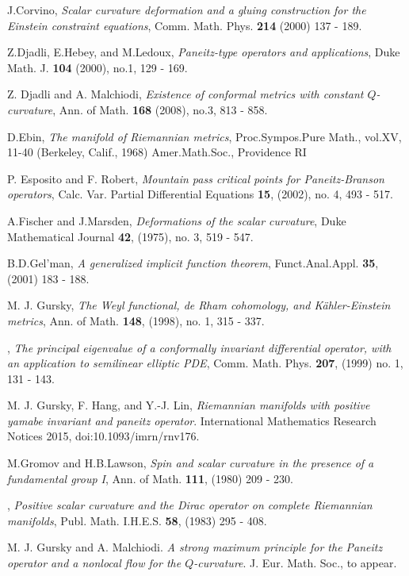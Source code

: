 \documentclass[12pt]{amsart}
\theoremstyle{definition}
\theoremstyle{remark}
\numberwithin{equation}{section}
\begin{document}
\begin{thebibliography}{10}
 J.Corvino, \textit{Scalar curvature deformation and a gluing construction for the Einstein constraint equations}, Comm. Math. Phys. \textbf{214} (2000) 137 - 189.

 Z.Djadli, E.Hebey, and M.Ledoux, \textit{Paneitz-type operators and applications}, Duke Math. J. \textbf{104} (2000), no.1, 129 - 169.
  

 Z. Djadli and A. Malchiodi, \textit{Existence of conformal metrics with constant {$Q$}-curvature}, Ann. of Math. \textbf{168} (2008), no.3, 813 - 858. 

 D.Ebin, \textit{The manifold of Riemannian metrics}, Proc.Sympos.Pure Math., vol.XV, 11-40 (Berkeley, Calif., 1968) Amer.Math.Soc., Providence RI

P. Esposito and F. Robert, \textit{Mountain pass critical points for Paneitz-Branson operators}, Calc. Var. Partial Differential Equations \textbf{15}, (2002), no. 4, 493 - 517. 

 A.Fischer and J.Marsden, \textit{Deformations of the scalar curvature},  Duke Mathematical Journal \textbf{42}, (1975), no. 3, 519 - 547.

 B.D.Gel'man, \textit{A generalized implicit function theorem}, Funct.Anal.Appl. \textbf{35}, (2001) 183 - 188.

M. J. Gursky, \textit{The {W}eyl functional, de {R}ham cohomology, and {K}\"ahler-{E}instein metrics}, Ann. of Math. \textbf{148}, (1998), no. 1, 315 - 337. 

\bysame, \emph{The principal eigenvalue of a conformally invariant differential operator, with an application to semilinear elliptic {PDE}}, Comm. Math. Phys. \textbf{207}, (1999) no. 1, 131 - 143. 

 M. J. Gursky, F. Hang, and Y.-J. Lin, \textit{Riemannian manifolds with positive yamabe invariant and paneitz operator}. International Mathematics Research Notices 2015, doi:10.1093/imrn/rnv176.

 M.Gromov and H.B.Lawson, \textit{Spin and scalar curvature in the presence of a fundamental group I}, Ann. of Math. \textbf{111}, (1980) 209 - 230. 

 \bysame, \textit{Positive scalar curvature and the Dirac operator on complete Riemannian manifolds}, Publ. Math. I.H.E.S. \textbf{58}, (1983) 295 - 408. 

 M. J. Gursky and A. Malchiodi. \textit{A strong maximum principle for the Paneitz operator and a nonlocal flow for the $Q$-curvature}. J. Eur. Math. Soc., to appear.


\end{thebibliography}
\end{document}
